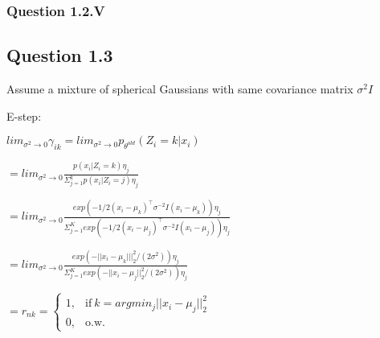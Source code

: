 \documentclass[
]{article}
\newenvironment{Shaded}{\begin{snugshade}}{\end{snugshade}}
\newcommand{\CommentTok}[1]{\textcolor[rgb]{0.56,0.35,0.01}{\textit{#1}}}
\newcommand{\DecValTok}[1]{\textcolor[rgb]{0.00,0.00,0.81}{#1}}
\newcommand{\FunctionTok}[1]{\textcolor[rgb]{0.00,0.00,0.00}{#1}}
\newcommand{\NormalTok}[1]{#1}
\newcommand{\SpecialCharTok}[1]{\textcolor[rgb]{0.00,0.00,0.00}{#1}}
\newcommand{\StringTok}[1]{\textcolor[rgb]{0.31,0.60,0.02}{#1}}
\begin{document}
\begin{Shaded}
\end{Shaded}

\hypertarget{question-1.2.v}{%
\subsubsection{Question 1.2.V}\label{question-1.2.v}}

\hypertarget{question-1.3}{%
\subsection{Question 1.3}\label{question-1.3}}

Assume a mixture of spherical Gaussians with same covariance matrix
\(\sigma^2I\)

E-step:

\(lim_{\sigma^2\rightarrow0}\gamma_{ik}=lim_{\sigma^2\rightarrow0}p_{\theta^{old}}(Z_i=k|x_i)\)

\(=lim_{\sigma^2\rightarrow0}\frac{p(x_i | Z_i = k)\eta_j}{\Sigma_{j=1}^k p(x_i | Z_i = j)\eta_j}\)

\(=lim_{\sigma^2\rightarrow0}\frac{exp(-1/2(x_i-\mu_k)^\top\sigma^{-2}I(x_i-\mu_k))\eta_j}{\Sigma_{j=1}^K exp(-1/2(x_i-\mu_j)^\top\sigma^{-2}I(x_i-\mu_j))\eta_j}\)

\(=lim_{\sigma^2\rightarrow0}\frac{exp(-||x_i-\mu_k|||_2^2/(2\sigma^{2}))\eta_j}{\Sigma_{j=1}^K exp(-||x_i-\mu_j||_2^2/(2\sigma^{2}))\eta_j}\)

\(=r_{nk}=\begin{cases}1, & \text{if}\ k=argmin_j||x_i-\mu_j||_2^2 \\0, & \text{o.w.}\end{cases}\)
\end{document}
